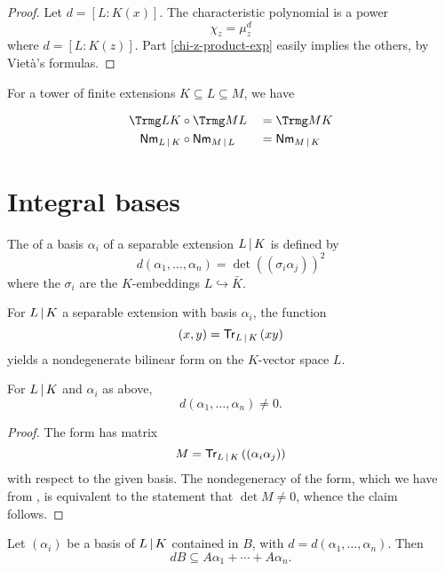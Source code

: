 \begin{proof}
  Let $d=[L:K(x)]$. The characteristic polynomial is a power
  \[\chi_z = \mu_z^d \]
  where $d=[L:K(z)]$. Part \ref{chi-z-product-exp} easily implies the others, by
  Viet\`a's formulas.
\end{proof}

\begin{theorem}{\label{mul-trace-norm}}
  For a tower of finite extensions $K \subseteq L \subseteq M$, we have

  \begin{alignat*}{2}
    \Trmg L K &\circ \Trmg M L &&= \Trmg M K\\
    \Nmmg L K &\circ \Nmmg M L &&= \Nmmg M K
  \end{alignat*}
\end{theorem}

\section{Integral bases}

\begin{definition}
  The  of a basis $\alpha_i$ of a separable extension
  $L \mathop{|} K$ is defined by
  \[ d(\alpha_1,\ldots,\alpha_n) = \det((\sigma_i\alpha_j))^2 \] where the
  $\sigma_i$ are the $K$-embeddings $L \hookrightarrow {\bar{K}}$.
\end{definition}


\begin{prop}{\label{trace-form-bilinear}}
  For $L \mathop{|} K$ a separable extension with basis $\alpha_i$, the
  function \[(x,y) = {{\mathsf{Tr}}_{L \mathop{|} K}}\left(xy\right)\] yields a nondegenerate bilinear form on the
  $K$-vector space $L$.
\end{prop}

\begin{corollary} For $L \mathop{|} K$ and $\alpha_i$ as above,
  \[d(\alpha_1,\ldots,\alpha_n) \neq 0.\]
\end{corollary}

\begin{proof}
  The form has matrix \[ M = {{\mathsf{Tr}}_{L \mathop{|} K}}\left((\alpha_i\alpha_j)\right) \] with respect to the
  given basis. The nondegeneracy of the form, which we have from
  , is equivalent to the statement that $\det M \ne
  0$, whence the claim follows.
\end{proof}

\begin{lemma}
  Let $(\alpha_i)$ be a basis of $L \mathop{|} K$ contained in $B$, with $d
  = d(\alpha_1,\ldots,\alpha_n)$. Then \[ dB \subseteq A\alpha_1 + \cdots +
  A\alpha_n. \]
\end{lemma}

